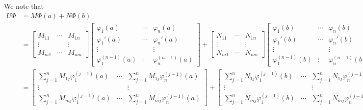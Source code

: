 \documentclass[10.5pt, oneside, a4paper]{article}
\begin{document}
{\color{blue}
\begin{rmk}
    We note that
    \begin{align*}
        U\Phi &= M\Phi(a) + N\Phi(b)\\
        &= 
        \begin{bmatrix}
            M_{11} & \cdots & M_{1n}\\
            \vdots &  & \vdots\\
            M_{m1} & \cdots & M_{mn}
        \end{bmatrix}
        \begin{bmatrix}
            \varphi_1(a) & \cdots & \varphi_n(a)\\
            \varphi_1'(a) & \cdots & \varphi_n'(a)\\
            \vdots& & \vdots\\
            \varphi_1^{(n-1)}(a) & \vdots & \varphi_n^{(n-1)}(a)
        \end{bmatrix} + 
        \begin{bmatrix}
            N_{11} & \cdots & N_{1n}\\
            \vdots &  & \vdots\\
            N_{m1} & \cdots & N_{mn}
        \end{bmatrix}
        \begin{bmatrix}
            \varphi_1(b) & \cdots & \varphi_n(b)\\
            \varphi_1'(b) & \cdots & \varphi_n'(b)\\
            \vdots& & \vdots\\
            \varphi_1^{(n-1)}(b) & \vdots & \varphi_n^{(n-1)}(b)
        \end{bmatrix}\\
        &= \begin{bmatrix}
            \sum_{j=1}^nM_{1j}\varphi_1^{(j-1)}(a) & \cdots & \sum_{j=1}^nM_{1j}\varphi_n^{(j-1)}(a)\\
            \vdots & & \vdots\\
            \sum_{j=1}^nM_{mj}\varphi_1^{(j-1)}(a) & \cdots & \sum_{j=1}^nM_{mj}\varphi_n^{(j-1)}(a)
        \end{bmatrix} +
        \begin{bmatrix}
            \sum_{j=1}^nN_{1j}\varphi_1^{(j-1)}(b) & \cdots & \sum_{j=1}^nN_{1j}\varphi_n^{(j-1)}(b)\\
            \vdots & & \vdots\\
            \sum_{j=1}^nN_{mj}\varphi_1^{(j-1)}(b) & \cdots & \sum_{j=1}^nN_{mj}\varphi_n^{(j-1)}(b)

\end{bmatrix}
\end{align*}
\end{rmk}}
\end{document}
